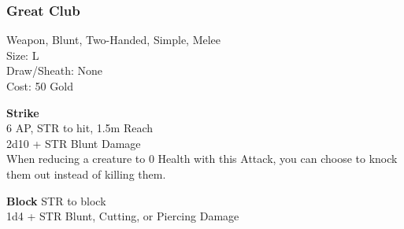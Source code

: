 \subsubsection{Great Club}\label{weapon:greatClub}
Weapon, Blunt, Two-Handed, Simple, Melee\\
Size: L\\
Draw/Sheath: None\\
Cost: 50 Gold

\textbf{Strike} \\
6 AP, STR to hit, 1.5m Reach\\
2d10 + \texttimes STR Blunt Damage\\
When reducing a creature to 0 Health with this Attack, you can choose to knock them out instead of killing them.

\textbf{Block}
STR to block\\
1d4 + \texttimes STR Blunt, Cutting, or Piercing Damage

